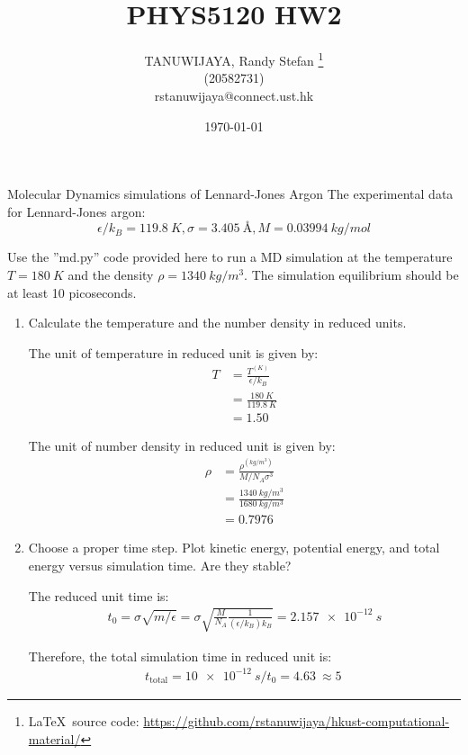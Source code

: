 \documentclass{article}
\title{PHYS5120 HW2}
\author{TANUWIJAYA, Randy Stefan \footnote{\LaTeX\ source code: \url{https://github.com/rstanuwijaya/hkust-computational-material/}}\\ (20582731) \\ rstanuwijaya@connect.ust.hk}
\affil{Department of Physics - HKUST}
\date{\today}
\begin{document}
\maketitle
\begin{section}{Molecular Dynamics simulations of Lennard-Jones Argon}
The experimental data for Lennard-Jones argon:
$$
	\epsilon/k_B = \SI{119.8}{K}, \sigma = \SI{3.405}{\angstrom}, M = \SI{0.03994}{kg/mol}
$$

Use the ''md.py'' code provided here to run a MD simulation at the temperature $T = \SI{180}{K}$ and the density $\rho = \SI{1340}{kg/m^3}$. The simulation equilibrium should be at least 10 picoseconds.

\begin{enumerate}[1.]
	\item Calculate the temperature and the number density in reduced units.
	\begin{tcolorbox}[breakable]
		The unit of temperature in reduced unit is given by:
		\begin{align*}
			T & = \frac{T^{(\unit{K})}}{\epsilon/k_B} \\
			  & = \frac{\SI{180}{K}}{\SI{119.8}{K}}   \\
			  & = \SI{1.50}{}
		\end{align*}

		The unit of number density in reduced unit is given by:
		\begin{align*}
			\rho & = \frac{\rho^{(\unit{kg/m^3})}}{M/N_A \sigma^3} \\
			     & = \frac{\SI{1340}{kg/m^3}}{\SI{1680}{kg/m^3}}   \\
			     & = \SI{0.7976}{}
		\end{align*}
	\end{tcolorbox}

	\newpage
	\item Choose a proper time step. Plot kinetic energy, potential energy, and total energy versus simulation time. Are they stable?

	\begin{tcolorbox}[breakable]
		The reduced unit time is:
		\begin{align*}
			t_0 = \sigma \sqrt{m/\epsilon} = \sigma \sqrt{\frac{M}{N_A} \frac{1}{(\epsilon/k_B)k_B}} = \SI{2.157e-12}{s}
		\end{align*}

		Therefore, the total simulation time in reduced unit is:
		\begin{align*}
			t_{\text{total}} = \SI{10e-12}{s} / t_0 = \SI{4.63}{}
			\approx \SI{5}{}
		\end{align*}


\end{tcolorbox}
\end{enumerate}
\end{section}
\end{document}
